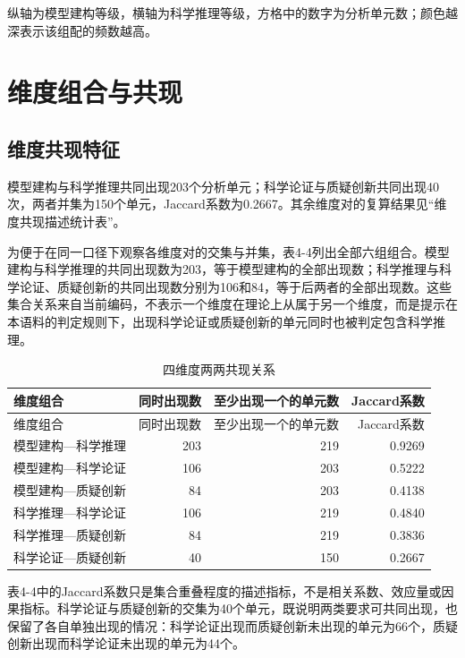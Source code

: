 \documentclass[
  12pt,
  a4paper]{ctexbook}
\begin{document}
纵轴为模型建构等级，横轴为科学推理等级，方格中的数字为分析单元数；颜色越深表示该组配的频数越高。

\section{维度组合与共现}\label{ux7ef4ux5ea6ux7ec4ux5408ux4e0eux5171ux73b0}

\subsection{维度共现特征}\label{ux7ef4ux5ea6ux5171ux73b0ux7279ux5f81}

模型建构与科学推理共同出现203个分析单元；科学论证与质疑创新共同出现40次，两者并集为150个单元，Jaccard系数为0.2667。其余维度对的复算结果见``维度共现描述统计表''。

为便于在同一口径下观察各维度对的交集与并集，表4-4列出全部六组组合。模型建构与科学推理的共同出现数为203，等于模型建构的全部出现数；科学推理与科学论证、质疑创新的共同出现数分别为106和84，等于后两者的全部出现数。这些集合关系来自当前编码，不表示一个维度在理论上从属于另一个维度，而是提示在本语料的判定规则下，出现科学论证或质疑创新的单元同时也被判定包含科学推理。

\begin{longtable}[]{@{}lrrr@{}}
\caption{四维度两两共现关系}\tabularnewline
\toprule\noalign{}
\rowcolor{ThesisPale}
维度组合 & 同时出现数 & 至少出现一个的单元数 & Jaccard系数 \\
\midrule\noalign{}
\endfirsthead
\toprule\noalign{}
\rowcolor{ThesisPale}
维度组合 & 同时出现数 & 至少出现一个的单元数 & Jaccard系数 \\
\midrule\noalign{}
\endhead
\bottomrule\noalign{}
\endlastfoot
模型建构---科学推理 & 203 & 219 & 0.9269 \\
模型建构---科学论证 & 106 & 203 & 0.5222 \\
模型建构---质疑创新 & 84 & 203 & 0.4138 \\
科学推理---科学论证 & 106 & 219 & 0.4840 \\
科学推理---质疑创新 & 84 & 219 & 0.3836 \\
科学论证---质疑创新 & 40 & 150 & 0.2667 \\
\end{longtable}

表4-4中的Jaccard系数只是集合重叠程度的描述指标，不是相关系数、效应量或因果指标。科学论证与质疑创新的交集为40个单元，既说明两类要求可共同出现，也保留了各自单独出现的情况：科学论证出现而质疑创新未出现的单元为66个，质疑创新出现而科学论证未出现的单元为44个。
\end{document}
